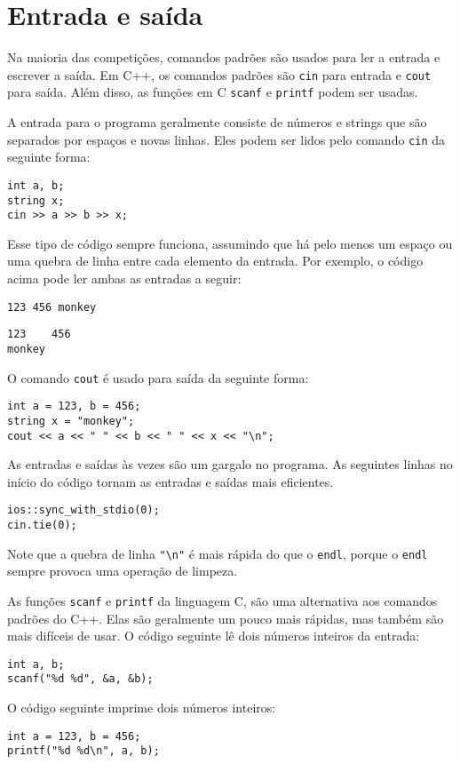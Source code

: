 \section{Entrada e saída}


Na maioria das competições, comandos padrões são usados para ler a entrada e escrever a saída. Em C++, os comandos padrões são \texttt{cin} para entrada e \texttt{cout} para saída. Além disso, as funções em C \texttt{scanf} e \texttt{printf} podem ser usadas.

A entrada para o programa geralmente consiste de números e strings que são separados por espaços e novas linhas. Eles podem ser lidos pelo comando \texttt{cin} da seguinte forma:

\begin{lstlisting}
int a, b;
string x;
cin >> a >> b >> x;
\end{lstlisting}

Esse tipo de código sempre funciona,
assumindo que há pelo menos um espaço
ou uma quebra de linha entre cada elemento da entrada.
Por exemplo, o código acima pode ler
ambas as entradas a seguir:
\begin{lstlisting}
123 456 monkey
\end{lstlisting}
\begin{lstlisting}
123    456
monkey
\end{lstlisting}
O comando \texttt{cout} é usado para saída
da seguinte forma:
\begin{lstlisting}
int a = 123, b = 456;
string x = "monkey";
cout << a << " " << b << " " << x << "\n";
\end{lstlisting}

As entradas e saídas às vezes são um gargalo no programa. As seguintes linhas no início do código tornam as entradas e saídas mais eficientes. 

\begin{lstlisting}
ios::sync_with_stdio(0);
cin.tie(0);
\end{lstlisting}

Note que a quebra de linha \texttt{"\textbackslash n"} é mais rápida do que o \texttt{endl}, porque o \texttt{endl} sempre provoca uma operação de limpeza.

As funções \texttt{scanf} e \texttt{printf} da linguagem C, são uma alternativa aos comandos padrões do C++. Elas são geralmente um pouco mais rápidas, mas também são mais difíceis de usar. O código seguinte lê dois números inteiros da entrada:
\begin{lstlisting}
int a, b;
scanf("%d %d", &a, &b);
\end{lstlisting}
O código seguinte imprime dois números inteiros:
\begin{lstlisting}
int a = 123, b = 456;
printf("%d %d\n", a, b);
\end{lstlisting}

